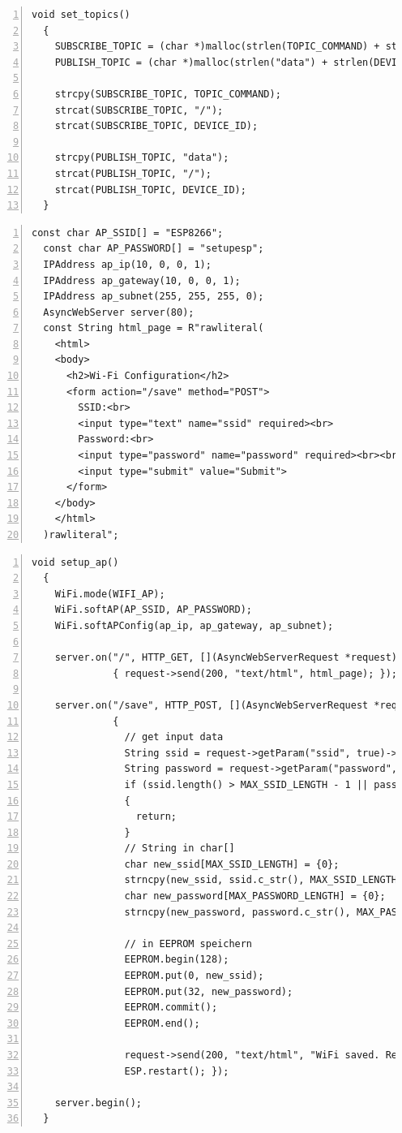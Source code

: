 \documentclass[12pt, letterpaper]{article}
\begin{document}
\begin{lstlisting}[frame=single, style=cpp, numbers=left, label={lst:espsettopics}, caption={ESP: set\_topics}]
  void set_topics()
  {
    SUBSCRIBE_TOPIC = (char *)malloc(strlen(TOPIC_COMMAND) + strlen(DEVICE_ID) + 2);
    PUBLISH_TOPIC = (char *)malloc(strlen("data") + strlen(DEVICE_ID) + 2);
  
    strcpy(SUBSCRIBE_TOPIC, TOPIC_COMMAND);
    strcat(SUBSCRIBE_TOPIC, "/");
    strcat(SUBSCRIBE_TOPIC, DEVICE_ID);
  
    strcpy(PUBLISH_TOPIC, "data");
    strcat(PUBLISH_TOPIC, "/");
    strcat(PUBLISH_TOPIC, DEVICE_ID);
  }
\end{lstlisting}
\begin{lstlisting}[frame=single, style=cpp, numbers=left, label={lst:esp8266defap}, caption={ESP8266: ap\_konfiguration}]
  const char AP_SSID[] = "ESP8266";
  const char AP_PASSWORD[] = "setupesp";
  IPAddress ap_ip(10, 0, 0, 1);
  IPAddress ap_gateway(10, 0, 0, 1);
  IPAddress ap_subnet(255, 255, 255, 0);
  AsyncWebServer server(80);
  const String html_page = R"rawliteral(
    <html>
    <body>
      <h2>Wi-Fi Configuration</h2>
      <form action="/save" method="POST">
        SSID:<br>
        <input type="text" name="ssid" required><br>
        Password:<br>
        <input type="password" name="password" required><br><br>
        <input type="submit" value="Submit">
      </form>
    </body>
    </html>
  )rawliteral";
\end{lstlisting}
\begin{lstlisting}[frame=single, style=cpp, numbers=left, label={lst:esp8266setupap}, caption={ESP: setup\_ap}]
  void setup_ap()
  {
    WiFi.mode(WIFI_AP);
    WiFi.softAP(AP_SSID, AP_PASSWORD);
    WiFi.softAPConfig(ap_ip, ap_gateway, ap_subnet);
  
    server.on("/", HTTP_GET, [](AsyncWebServerRequest *request)
              { request->send(200, "text/html", html_page); });
  
    server.on("/save", HTTP_POST, [](AsyncWebServerRequest *request)
              {
                // get input data
                String ssid = request->getParam("ssid", true)->value();
                String password = request->getParam("password", true)->value();
                if (ssid.length() > MAX_SSID_LENGTH - 1 || password.length() > MAX_PASSWORD_LENGTH - 1)
                {
                  return;
                }
                // String in char[]
                char new_ssid[MAX_SSID_LENGTH] = {0};
                strncpy(new_ssid, ssid.c_str(), MAX_SSID_LENGTH - 1);
                char new_password[MAX_PASSWORD_LENGTH] = {0};
                strncpy(new_password, password.c_str(), MAX_PASSWORD_LENGTH - 1);
  
                // in EEPROM speichern
                EEPROM.begin(128);
                EEPROM.put(0, new_ssid);
                EEPROM.put(32, new_password);
                EEPROM.commit();
                EEPROM.end();
  
                request->send(200, "text/html", "WiFi saved. Rebooting...");
                ESP.restart(); });
  
    server.begin();
  }
\end{lstlisting}
\end{document}
